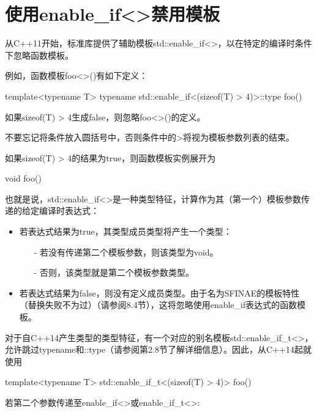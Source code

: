 \section{使用enable\_if<>禁用模板}
从C++11开始，标准库提供了辅助模板std::enable\_if<>，以在特定的编译时条件下忽略函数模板。

例如，函数模板foo<>()有如下定义：

\begin{cpp}
template<typename T>
typename std::enable_if<(sizeof(T) > 4)>::type
foo() {}
\end{cpp}

如果sizeof(T) > 4生成false，则忽略foo<>()的定义。

\begin{notice}
不要忘记将条件放入圆括号中，否则条件中的>将视为模板参数列表的结束。
\end{notice}

如果sizeof(T) > 4的结果为true，则函数模板实例展开为

\begin{cpp}
void foo() {}
\end{cpp}

也就是说，std::enable\_if<>是一种类型特征，计算作为其（第一个）模板参数传递的给定编译时表达式：

\begin{itemize}
\item 
若表达式结果为true，其类型成员类型将产生一个类型：

\begin{itemize}
\item[-]
若没有传递第二个模板参数，则该类型为void。
	
\item[-]
否则，该类型就是第二个模板参数类型。
\end{itemize}

\item 
若表达式结果为false，则没有定义成员类型。由于名为SFINAE的模板特性（替换失败不为过）（请参阅8.4节），这将忽略使用enable\_if表达式的函数模板。
\end{itemize}

对于自C++14产生类型的类型特征，有一个对应的别名模板std::enable\_if\_t<>，允许跳过typename和::type（请参阅第2.8节了解详细信息）。因此，从C++14起就使用

\begin{cpp}
template<typename T>
std::enable_if_t<(sizeof(T) > 4)>
foo() {}
\end{cpp}

若第二个参数传递至enable\_if<>或enable\_if\_t<>:

